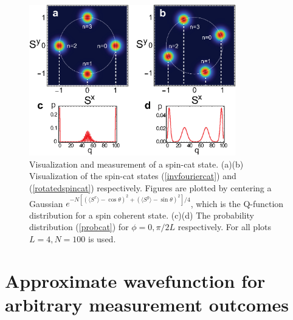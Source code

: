 \documentclass[12pt]{iopart}
\begin{document}
\begin{figure}[ht]
    \centering
    \includegraphics[width=0.8\textwidth]{measurement}
    \caption{Visualization and measurement of a spin-cat state. (a)(b) Visualization of the spin-cat states (\ref{invfouriercat}) and (\ref{rotatedspincat}) respectively. Figures are plotted by centering a Gaussian $ e^{- N[ (\langle S^x \rangle - \cos \theta)^2 + (\langle S^y \rangle - \sin \theta)^2]/4} $, which is the Q-function distribution for a spin coherent state.  (c)(d) The probability distribution (\ref{probcat}) for $ \phi = 0, \pi/2L $ respectively.  For all plots $ L = 4, N = 100 $ is used.  }
    \label{fig:measurement}
\end{figure}






















\section{Approximate wavefunction for arbitrary measurement outcomes}
\label{sec:approxwav}
\end{document}
